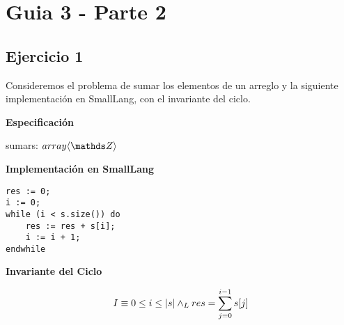 





\maketitle
\newpage

\tableofcontents
\newpage

\section{Guia 3 - Parte 2}

\subsection{Ejercicio 1}
Consideremos el problema de sumar los elementos de un arreglo y la siguiente implementación en SmallLang, con el invariante del ciclo.

\begin{multicols}{2}
    \begin{minipage}{0.4\textwidth}
        \large\textbf{Especificación}

        \begin{proc}{sumar}{\In s: $array\langle \ent \rangle$}{\ent}
        \end{proc}
    \end{minipage}

    \begin{minipage}{0.4\textwidth}
        \large\textbf{Implementación en SmallLang}

        \begin{lstlisting}[numbers=none,frame=none,xleftmargin=0pt]
res := 0;
i := 0;
while (i < s.size()) do
    res := res + s[i];
    i := i + 1;
endwhile
        \end{lstlisting}
    \end{minipage}
\end{multicols}

\large\textbf{Invariante del Ciclo}

\[I \equiv 0 \leq i \leq |s| \land _L res = \sum_{j=0}^{i-1} s[j]\]

